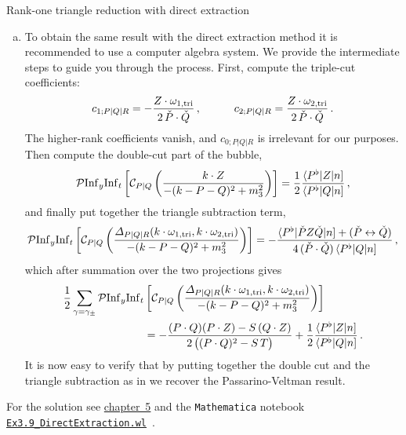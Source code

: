 \begin{exer}{Rank-one triangle reduction with direct extraction}
\begin{enumerate}[a)]
\item To obtain the same result with the direct extraction method it is recommended to use a computer algebra system. We provide the intermediate steps to guide you through the process.
First, compute the triple-cut coefficients:
\begin{align}
c_{1;P|Q|R} = - \frac{Z\cdot \omega_{1,{\rm tri}}}{2 \, \check{P}\cdot \check{Q}} \,, \qquad \quad
c_{2;P|Q|R} = \frac{Z\cdot \omega_{2,{\rm tri}}}{2 \, \check{P}\cdot \check{Q}} \,.
\end{align}
The higher-rank coefficients vanish, and $c_{0;P|Q|R}$ is irrelevant for our purposes.
Then compute the double-cut part of the bubble,
\begin{align}
  \mathcal{P} {\rm Inf}_y {\rm Inf}_t \left[  \mathcal{C}_{P|Q} \left( \frac{k\cdot Z}{-(k-P-Q)^2+m_3^2} \right)  \right]
  = \frac{1}{2} \frac{\langle P^\flat | Z | n ]}{\langle P^\flat | Q | n ]} \,,
\end{align}
and finally put together the triangle subtraction term,
\begin{align}
  \mathcal{P} {\rm Inf}_y {\rm Inf}_t \left[ \mathcal{C}_{P|Q} \left(\frac{\Delta_{P|Q|R}(k\cdot\omega_{1,{\rm tri}}, k\cdot\omega_{2,{\rm tri}})}{-(k-P-Q)^2+m_3^2} \right) \right]
 = - \frac{\langle P^{\flat}|\check{P} Z \check{Q}|n] + (\check{P} \leftrightarrow \check{Q})}{4 \, (\check{P}\cdot \check{Q}) \, \spAB{P^{\flat}}{Q}{n} } \,,
\end{align}
which after summation over the two projections gives
\begin{align}
\begin{aligned}
 \frac{1}{2} \sum_{\gamma=\gamma_\pm} \mathcal{P} {\rm Inf}_y {\rm Inf}_t & \left[ \mathcal{C}_{P|Q}\left( \frac{\Delta_{P|Q|R}(k\cdot\omega_{1,{\rm tri}}, k\cdot\omega_{2,{\rm tri}})}{-(k-P-Q)^2+m_3^2} \right) \right] \\
 & = - \frac{(P\cdot Q) (P\cdot Z) - S \, (Q\cdot Z)}{2 \, \bigl( (P\cdot Q)^2 - S\,T \bigr)} + \frac{1}{2} \frac{\spAB{P^\flat}{Z}{n}}{\spAB{P^\flat}{Q}{n}} \,.
\end{aligned}
\end{align}
It is now easy to verify that by putting together the double cut and the triangle subtraction as in  we recover the Passarino-Veltman result.
\end{enumerate}

\noindent
For the solution see \hyperref[Sol:3.DirectExtraction]{chapter~5} and the \texttt{Mathematica} notebook \break \href{https://scattering-amplitudes.mpp.mpg.de/scattering-amplitudes-in-qft/Exercises/}{\texttt{Ex3.9\_DirectExtraction.wl}}~\cite{website-ch3}.
\end{exer}

